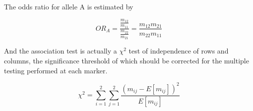 \documentclass[../main.tex]{subfiles}
\begin{document}
The odds ratio for allele A is estimated by

\begin{equation}
	OR_A = \frac{\frac{m_{12}}{m_{11}}}{\frac{m_{22}}{m_{21}}} =
		\frac{m_{12}m_{21}}{m_{22}m_{11}}
\end{equation}

And the association test is actually a $\chi^2$ test of independence of 
rows and columns, the significance threshold of which should be 
corrected for the multiple testing performed at each marker.

\begin{equation}
	\chi^2 = \sum_{i=1}^{2} \sum_{j=1}^{2}
		\frac{(m_{ij} - E[m_{ij}])^2}{E[m_{ij}]}
\end{equation}
\end{document}
